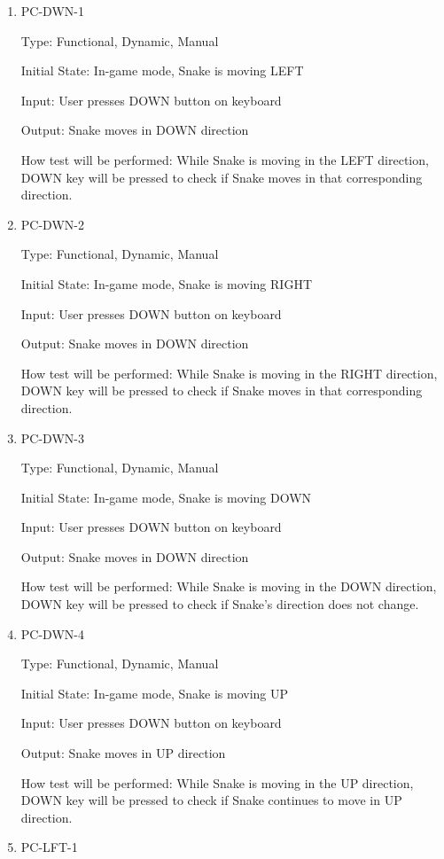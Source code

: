 \documentclass[12pt, titlepage]{article}
\begin{document}
\begin{enumerate}
\item{PC-DWN-1}
\label{pc-dwn-1}

Type: Functional, Dynamic, Manual

Initial State: In-game mode, Snake is moving LEFT

Input: User presses DOWN button on keyboard

Output: Snake moves in DOWN direction

How test will be performed: While Snake is moving in the LEFT direction, DOWN key will be pressed to check if Snake moves in that corresponding direction. 

\item{PC-DWN-2}
\label{pc-dwn-2}

Type: Functional, Dynamic, Manual

Initial State: In-game mode, Snake is moving RIGHT

Input: User presses DOWN button on keyboard

Output: Snake moves in DOWN direction

How test will be performed: While Snake is moving in the RIGHT direction, DOWN key will be pressed to check if Snake moves in that corresponding direction. 

\item{PC-DWN-3}
\label{pc-dwn-3}

Type: Functional, Dynamic, Manual

Initial State: In-game mode, Snake is moving DOWN

Input: User presses DOWN button on keyboard

Output: Snake moves in DOWN direction

How test will be performed: While Snake is moving in the DOWN direction, DOWN key will be pressed to check if Snake's direction does not change.

\item{PC-DWN-4}
\label{pc-dwn-4}

Type: Functional, Dynamic, Manual

Initial State: In-game mode, Snake is moving UP

Input: User presses DOWN button on keyboard

Output: Snake moves in UP direction

How test will be performed: While Snake is moving in the UP direction, DOWN key will be pressed to check if Snake continues to move in UP direction. 

\item{PC-LFT-1}
\label{pc-lft-1}


\end{enumerate}
\end{document}
